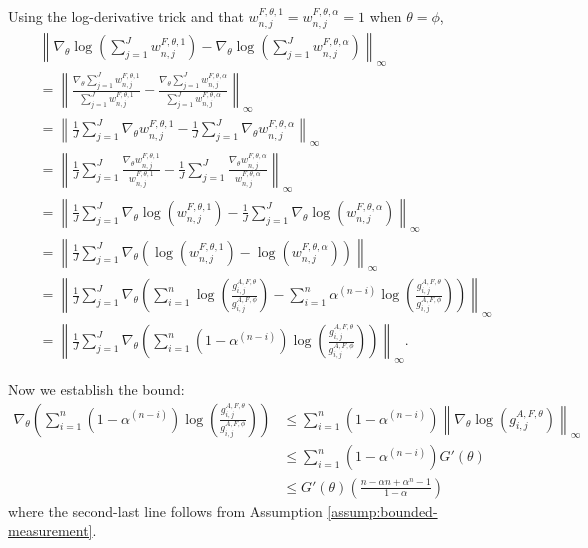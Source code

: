 \documentclass{article}
\begin{document}
Using the log-derivative trick and that $w_{n,j}^{F,\theta,1} = w_{n,j}^{F,\theta,\alpha} = 1$ when $\theta=\phi$,
\begin{align*}
    &\left\lVert\nabla_\theta\log\left(\sum_{j=1}^J w_{n,j}^{F,\theta,1}\right)-\nabla_\theta\log\left(\sum_{j=1}^J w_{n,j}^{F,\theta,\alpha}\right)\right\rVert_{\infty}\\
    &= \left\lVert\frac{\nabla_\theta\sum_{j=1}^J w_{n,j}^{F,\theta,1}}{{\sum_{j=1}^J w_{n,j}^{F,\theta,1}}}-\frac{\nabla_\theta\sum_{j=1}^J w_{n,j}^{F,\theta,\alpha}}{{\sum_{j=1}^J w_{n,j}^{F,\theta,\alpha}}}\right\rVert_{\infty} \\
    &= \left\lVert\frac{1}{J}\sum_{j=1}^J \nabla_\theta w_{n,j}^{F,\theta,1}-\frac{1}{J}\sum_{j=1}^J \nabla_\theta w_{n,j}^{F,\theta,\alpha}\right\rVert_{\infty} \\
    &= \left\lVert\frac{1}{J}\sum_{j=1}^J \frac{\nabla_\theta w_{n,j}^{F,\theta,1}}{w_{n,j}^{F,\theta,1}}-\frac{1}{J}\sum_{j=1}^J \frac{\nabla_\theta w_{n,j}^{F,\theta,\alpha}}{w_{n,j}^{F,\theta,\alpha}}\right\rVert_{\infty} \\
    &= \left\lVert\frac{1}{J}\sum_{j=1}^J \nabla_\theta \log\left(w_{n,j}^{F,\theta,1}\right)-\frac{1}{J}\sum_{j=1}^J \nabla_\theta \log\left(w_{n,j}^{F,\theta,\alpha}\right)\right\rVert_{\infty} \\
    &= \left\lVert\frac{1}{J}\sum_{j=1}^J \nabla_\theta \left(\log\left(w_{n,j}^{F,\theta,1}\right)-\log\left(w_{n,j}^{F,\theta,\alpha}\right)\right)\right\rVert_{\infty}\\
    &= \left\lVert\frac{1}{J}\sum_{j=1}^J \nabla_\theta \left(\sum_{i=1}^n\log\left(\frac{g_{i,j}^{A,F,\theta}}{g_{i,j}^{A,F,\phi}} \right) - \sum_{i=1}^n{\alpha^{(n-i)}}\log\left(\frac{g_{i,j}^{A,F,\theta}}{g_{i,j}^{A,F,\phi}} \right)\right)\right\rVert_{\infty} \\
    &= \left\lVert\frac{1}{J}\sum_{j=1}^J \nabla_\theta \left(\sum_{i=1}^n\left(1-\alpha^{(n-i)}\right)\log\left(\frac{g_{i,j}^{A,F,\theta}}{g_{i,j}^{A,F,\phi}} \right) \right)\right\rVert_{\infty}.
\end{align*}

Now we establish the bound:
\begin{align*}
     \nabla_\theta \left(\sum_{i=1}^n\left(1-\alpha^{(n-i)}\right)\log\left(\frac{g_{i,j}^{A,F,\theta}}{g_{i,j}^{A,F,\phi}} \right) \right)
     &\leq \sum_{i=1}^n\left(1-\alpha^{(n-i)}\right)\left\lVert\nabla_\theta\log\left(g_{i,j}^{A,F,\theta} \right)\right\rVert_{\infty}\\
    &\leq \sum_{i=1}^n\left(1-\alpha^{(n-i)}\right)G'(\theta)\\
    &\leq G'(\theta)\left(\frac{n-\alpha n + \alpha^n - 1}{1-\alpha}\right)
\end{align*}
where the second-last line follows from Assumption \ref{assump:bounded-measurement}.
\end{document}
